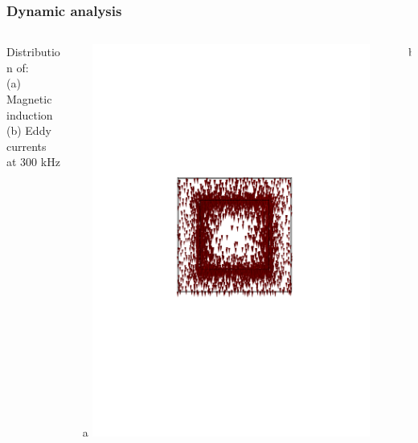 \documentclass[compress]{beamer}
\begin{document}
\begin{frame}\frametitle{Dynamic analysis}
\begin{columns}[totalwidth=\textwidth]
	\begin{column}{.30\textwidth}
	Distribution of: \\
	(a) Magnetic induction \\
	(b) Eddy currents \\
	at 300 kHz
	\end{column}
	\begin{column}{.35\textwidth}
	\centering
	a
	\includegraphics[width=0.9\textwidth]{Graphic/04_B3cubemagnefield300k_XZview.pdf}
	\end{column}
	\begin{column}{.35\textwidth}
	\centering	
	b

\end{column}
\end{columns}
\end{frame}
\end{document}
